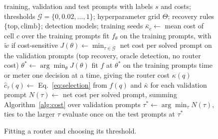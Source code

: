 \documentclass[final,5p,times,twocolumn]{elsarticle}
\makeatletter
\newcounter{algorithm}
\newenvironment{algorithm}[1][tbp]{\begin{figure}[#1]\def\@captype{algorithm}}%
  {\end{figure}}
\theoremstyle{plain}
\makeatother
\begin{document}
\begin{algorithm}[t]
\caption{Fitting a router and choosing its threshold.}
\label{alg:router}
\small
\begin{algorithmic}[1]
\Require training, validation and test prompts with labels $s$ and costs;
  thresholds $\mathcal{G} = \{0, 0.02, \dots, 1\}$; hyperparameter grid
  $\Theta$; recovery rules $\{\mathrm{top}, \mathrm{climb}\}$; detection
  models; training seeds
\State $\bar{\kappa}_c \gets$ mean cost of cell $c$ over the training prompts
\For{$\theta \in \Theta$}
  \State fit $f_\theta$ on the training prompts, with $\tilde{w}$ if
    cost-sensitive
  \State $J(\theta) \gets \min_{\tau \in \mathcal{G}}$ net cost per solved
    prompt on the validation prompts (top recovery, oracle detection, no
    router cost)
\EndFor
\State $\theta^{*} \gets \arg\min_{\theta} J(\theta)$
  \State fit $f$ at $\theta^{*}$ on the training prompts
  \State time or meter one decision at a time, giving the router cost
    $\kappa(q)$
      \State $\hat{c}_\tau(q) \gets$ Eq.~\eqref{eq:selection} from
        $f(q)$ and $\bar{\kappa}$ for each validation prompt
      \State $N(\tau) \gets$ net cost per solved prompt, summing
        Algorithm~\ref{alg:cost} over validation prompts
    \EndFor
    \State $\tau^{*} \gets \arg\min_{\tau} N(\tau)$, ties to the larger
      $\tau$
    \State evaluate once on the test prompts at $\tau^{*}$
  \EndFor
\EndFor
\end{algorithmic}
\end{algorithm}
\end{document}
